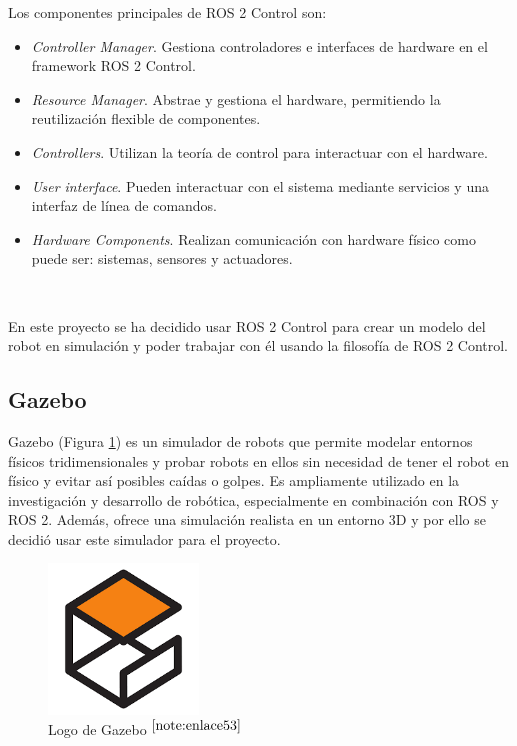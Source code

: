 Los componentes principales de \acs{ROS} 2 Control son:

\begin{itemize}
	\item\textit{Controller Manager}. Gestiona controladores e interfaces de hardware en el framework \acs{ROS} 2 Control.
	\item \textit{Resource Manager}. Abstrae y gestiona el hardware, permitiendo la reutilización flexible de componentes.
	\item \textit{Controllers}. Utilizan la teoría de control para interactuar con el hardware.
	\item \textit{User interface}. Pueden interactuar con el sistema mediante servicios y una interfaz de línea de comandos.
	\item \textit{Hardware Components}. Realizan comunicación con hardware físico como puede ser: sistemas, sensores y actuadores.
\end{itemize}\

En este proyecto se ha decidido usar \acs{ROS} 2 Control para crear un modelo del robot en simulación y poder trabajar con él usando la filosofía de \acs{ROS} 2 Control.


\subsection{Gazebo}

Gazebo (Figura \ref{fig:gazebo}) es un simulador de robots que permite modelar entornos físicos tridimensionales y probar robots en ellos sin necesidad de tener el robot en físico y evitar así posibles caídas o golpes. Es ampliamente utilizado en la investigación y desarrollo de robótica, especialmente en combinación con \acs{ROS} y \acs{ROS} 2. Además, ofrece una simulación realista en un entorno 3D y por ello se decidió usar este simulador para el proyecto.

\begin{figure} [h!]
	\begin{center}
		\includegraphics[width=4cm]{figs/gazebo.png}
	\end{center}
	\caption{Logo de Gazebo $^{\ref{note:enlace53}}$} 
	\label{fig:gazebo}
\end{figure}\

